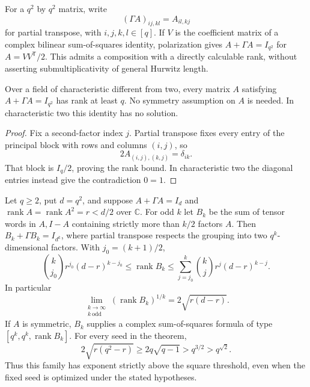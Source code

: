 For a $q^2$ by $q^2$ matrix, write
\[
 (\Gamma A)_{ij,k l}=A_{i l,kj}
\]
for partial transpose, with $i,j,k,l\in[q]$. If $V$ is the coefficient
matrix of a complex bilinear sum-of-squares identity, polarization
gives $A+\Gamma A=I_{q^2}$ for $A=VV^{\mathsf T}/2$.
This admits a composition with a directly calculable rank, without
asserting submultiplicativity of general Hurwitz length.

\begin{lemma}
\label{lem:partial-transpose-seed-rank}
Over a field of characteristic different from two, every matrix
$A$ satisfying $A+\Gamma A=I_{q^2}$ has rank at least $q$.
No symmetry assumption on $A$ is needed.
In characteristic two this identity has no solution.
\end{lemma}

\begin{proof}
Fix a second-factor index $j$. Partial transpose fixes every entry
of the principal block with rows and columns $(i,j)$, so
\[
 2A_{(i,j),(k,j)}=\delta_{ik}.
\]
That block is $I_q/2$, proving the rank bound. In characteristic
two the diagonal entries instead give the contradiction $0=1$.
\end{proof}

\begin{theorem}
\label{thm:hurwitz-majority-rate}
Let $q\ge2$, put $d=q^2$, and suppose
$A+\Gamma A=I_d$ and
$\operatorname{rank}A=\operatorname{rank}A^2=r<d/2$ over
$\mathbb C$. For odd $k$ let $B_k$ be the sum of tensor words in
$A,I-A$ containing strictly more than $k/2$ factors $A$.
Then $B_k+\Gamma B_k=I_{d^k}$, where partial transpose respects the
grouping into two $q^k$-dimensional factors. With $j_0=(k+1)/2$,
\begin{equation}\label{eq:majority-rank-bounds}
 \binom{k}{j_0}r^{j_0}(d-r)^{k-j_0}
 \le\operatorname{rank}B_k
 \le\sum_{j=j_0}^k\binom{k}{j}r^j(d-r)^{k-j}.
\end{equation}
In particular
\[
 \lim_{\substack{k\to\infty\\k\ \text{odd}}}
       (\operatorname{rank}B_k)^{1/k}=2\sqrt{r(d-r)}.
\]
If $A$ is symmetric, $B_k$ supplies a complex sum-of-squares formula
of type $[q^k,q^k,\operatorname{rank}B_k]$.
For every seed in the theorem,
\[
 2\sqrt{r(q^2-r)}\ge2q\sqrt{q-1}>q^{3/2}>q^{\sqrt2}.
\]
Thus this family has exponent strictly above the square threshold,
even when the fixed seed is optimized under the stated hypotheses.
\end{theorem}

